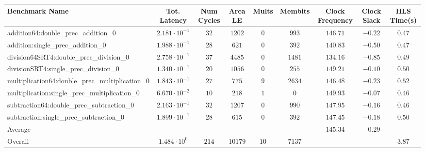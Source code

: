 \begin{tabular}{|l|c|c|c|c|c|c|c|c|}
\hline
Benchmark Name                                   & Tot. Latency            & Num Cycles & Area LE   & Mults  & Membits  & Clock Frequency & Clock Slack & HLS Time(s) \\
\hline
addition64:double\_prec\_addition\_0             & $ 2.181 \cdot 10^{-1} $ & $ 32     $ & $ 1202  $ & $ 0  $ & $ 993  $ & $ 146.71      $ & $ -0.22   $ & $ 0.47    $ \\
addition:single\_prec\_addition\_0               & $ 1.988 \cdot 10^{-1} $ & $ 28     $ & $ 621   $ & $ 0  $ & $ 392  $ & $ 140.83      $ & $ -0.50   $ & $ 0.47    $ \\
division64SRT4:double\_prec\_division\_0         & $ 2.758 \cdot 10^{-1} $ & $ 37     $ & $ 4485  $ & $ 0  $ & $ 1481 $ & $ 134.16      $ & $ -0.85   $ & $ 0.49    $ \\
divisionSRT4:single\_prec\_division\_0           & $ 1.340 \cdot 10^{-1} $ & $ 20     $ & $ 1056  $ & $ 0  $ & $ 255  $ & $ 149.21      $ & $ -0.10   $ & $ 0.50    $ \\
multiplication64:double\_prec\_multiplication\_0 & $ 1.843 \cdot 10^{-1} $ & $ 27     $ & $ 775   $ & $ 9  $ & $ 2634 $ & $ 146.48      $ & $ -0.23   $ & $ 0.52    $ \\
multiplication:single\_prec\_multiplication\_0   & $ 6.670 \cdot 10^{-2} $ & $ 10     $ & $ 218   $ & $ 1  $ & $ 0    $ & $ 149.93      $ & $ -0.07   $ & $ 0.46    $ \\
subtraction64:double\_prec\_subtraction\_0       & $ 2.163 \cdot 10^{-1} $ & $ 32     $ & $ 1207  $ & $ 0  $ & $ 990  $ & $ 147.95      $ & $ -0.16   $ & $ 0.46    $ \\
subtraction:single\_prec\_subtraction\_0         & $ 1.899 \cdot 10^{-1} $ & $ 28     $ & $ 615   $ & $ 0  $ & $ 392  $ & $ 147.45      $ & $ -0.18   $ & $ 0.50    $ \\
\hline
Average                                          & $                     $ & $        $ & $       $ & $    $ & $      $ & $ 145.34      $ & $ -0.29   $ & $         $ \\
\hline
Overall                                          & $ 1.484 \cdot 10^{0}  $ & $ 214    $ & $ 10179 $ & $ 10 $ & $ 7137 $ & $             $ & $         $ & $ 3.87    $ \\
\hline
\end{tabular}
